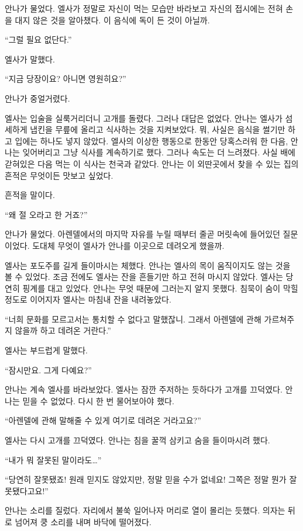 안나가 물었다. 엘사가 정말로 자신이 먹는 모습만 바라보고 자신의 접시에는 전혀 손을 대지 않은 것을 알아챘다. 이 음식에 독이 든 것이 아닐까.

``그럴 필요 없단다.''

엘사가 말했다.

``지금 당장이요? 아니면 영원히요?''

안나가 중얼거렸다.

엘사는 입술을 실룩거리더니 고개를 돌렸다. 그러나 대답은 없었다. 안나는 엘사가 섬세하게 냅킨을 무릎에 올리고 식사하는 것을 지켜보았다. 뭐, 사실은 음식을 썰기만 하고 입에는 하나도 넣지 않았다. 엘사의 이상한 행동으로 한동안 당혹스러워 한 다음, 안나는 잊어버리고 그냥 식사를 계속하기로 했다. 그러나 속도는 더 느려졌다. 사실 배에 갇혀있은 다음 먹는 이 식사는 천국과 같았다. 안나는 이 외딴곳에서 찾을 수 있는 집의 흔적은 무엇이든 맛보고 싶었다.

 흔적을 말이다.

``왜 절 오라고 한 거죠?''

안나가 물었다. 아렌델에서의 마지막 자유를 누릴 때부터 줄곧 머릿속에 들어있던 질문이었다. 도대체 무엇이 엘사가 안나를 이곳으로 데려오게 했을까.

엘사는 포도주를 길게 들이마시는 체했다. 안나는 엘사의 목이 움직이지도 않는 것을 볼 수 있었다. 조금 전에도 엘사는 잔을 흔들기만 하고 전혀 마시지 않았다. 엘사는 당연히 핑계를 대고 있었다. 안나는 무엇 때문에 그러는지 알지 못했다. 침묵이 숨이 막힐 정도로 이어지자 엘사는 마침내 잔을 내려놓았다.

``너희 문화를 모르고서는 통치할 수 없다고 말했잖니. 그래서 아렌델에 관해 가르쳐주지 않을까 하고 데려온 거란다.''

엘사는 부드럽게 말했다.

``잠시만요. 그게 다예요?''

안나는 계속 엘사를 바라보았다. 엘사는 잠깐 주저하는 듯하다가 고개를 끄덕였다. 안나는 믿을 수 없었다. 다시 한 번 물어보아야 했다.

``아렌델에 관해 말해줄 수 있게 여기로 데려온 거라고요?''

엘사는 다시 고개를 끄덕였다. 안나는 침을 꿀꺽 삼키고 숨을 들이마시려 했다.

``내가 뭐 잘못된 말이라도\ldots''

``당연히 잘못됐죠! 원래 믿지도 않았지만, 정말 믿을 수가 없네요! 그쪽은 정말 뭔가 잘못됐다고요!''

안나는 소리를 질렀다. 자리에서 불쑥 일어나자 머리로 열이 몰리는 듯했다. 의자는 뒤로 넘어져 쿵 소리를 내며 바닥에 떨어졌다.

